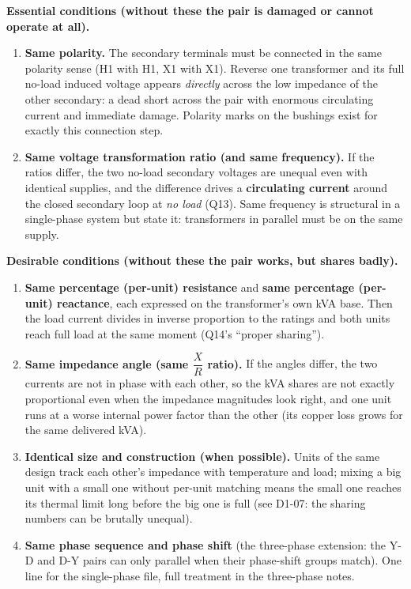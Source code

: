 \documentclass[11pt]{article}
\begin{document}
\textbf{Essential conditions (without these the pair is damaged or cannot operate at all).}
\begin{enumerate}[label=\arabic*.]
\item \textbf{Same polarity.} The secondary terminals must be connected in the same polarity sense (H1 with H1, X1 with X1). Reverse one transformer and its full no-load induced voltage appears \emph{directly} across the low impedance of the other secondary: a dead short across the pair with enormous circulating current and immediate damage. Polarity marks on the bushings exist for exactly this connection step.
\item \textbf{Same voltage transformation ratio (and same frequency).} If the ratios differ, the two no-load secondary voltages are unequal even with identical supplies, and the difference drives a \textbf{circulating current} around the closed secondary loop at \emph{no load} (Q13). Same frequency is structural in a single-phase system but state it: transformers in parallel must be on the same supply.
\end{enumerate}

\textbf{Desirable conditions (without these the pair works, but shares badly).}
\begin{enumerate}[label=\arabic*.]
\item \textbf{Same percentage (per-unit) resistance} and \textbf{same percentage (per-unit) reactance}, each expressed on the transformer's own kVA base. Then the load current divides in inverse proportion to the ratings and both units reach full load at the same moment (Q14's ``proper sharing'').
\item \textbf{Same impedance angle (same $\dfrac{X}{R}$ ratio).} If the angles differ, the two currents are not in phase with each other, so the kVA shares are not exactly proportional even when the impedance magnitudes look right, and one unit runs at a worse internal power factor than the other (its copper loss grows for the same delivered kVA).
\item \textbf{Identical size and construction (when possible).} Units of the same design track each other's impedance with temperature and load; mixing a big unit with a small one without per-unit matching means the small one reaches its thermal limit long before the big one is full (see D1-07: the sharing numbers can be brutally unequal).
\item \textbf{Same phase sequence and phase shift} (the three-phase extension: the Y-D and D-Y pairs can only parallel when their phase-shift groups match). One line for the single-phase file, full treatment in the three-phase notes.
\end{enumerate}
\end{document}

